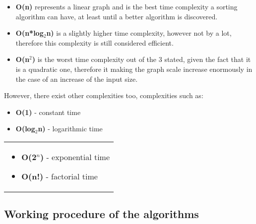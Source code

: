 \documentclass{article}
\begin{document}
\begin{itemize}
\item \textbf{O(n)} represents a linear graph and is the best time complexity a sorting algorithm can have, at least until a better algorithm is discovered. 


\item \textbf{O(n*log$_2$n)} is a slightly higher time complexity, however not by a lot, therefore this complexity is still considered efficient.


\item \textbf{O(n$^2$)} is the worst time complexity out of the 3 stated, given the fact that it is a quadratic one, therefore it making the graph scale increase enormously in the case of an increase of the input size.
\end{itemize}

However, there exist other complexities too, complexities such as:
\newline
\begin{minipage}{0.45\textwidth}
\begin{itemize}
  \item \textbf{O(1)} - constant time
  \item \textbf{O(log$_2$n)} - logarithmic time
\end{itemize}
\end{minipage}%
\hfill
\begin{minipage}{0.45\textwidth}
\begin{tabular}{p{\textwidth}}
\begin{itemize}
    \item \textbf{O(2$^{n}$)} - exponential time
    \item \textbf{O(n!)} - factorial time
\end{itemize}
\end{tabular}
\end{minipage}%


\pagebreak

\begin{center}
   \section{Working procedure of the algorithms} 
\end{center}
\end{document}

